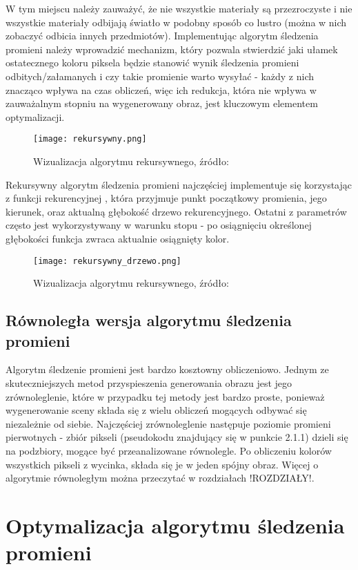 W tym miejscu należy zauważyć, że nie wszystkie materiały są przezroczyste i nie wszystkie materiały odbijają światło w podobny sposób co lustro (można w nich zobaczyć odbicia innych przedmiotów). Implementując algorytm śledzenia promieni należy wprowadzić mechanizm, który pozwala stwierdzić jaki ułamek ostatecznego koloru piksela będzie stanowić wynik śledzenia promieni odbitych/załamanych i czy takie promienie warto wysyłać - każdy z nich znacząco wpływa na czas obliczeń, więc ich redukcja, która nie wpływa w zauważalnym stopniu na wygenerowany obraz, jest kluczowym elementem optymalizacji.


\begin{figure}[h!]
\centering
  \caption{Wizualizacja algorytmu rekursywnego, źródło: \cite{scratch}}
  \texttt{[image: rekursywny.png]}
\end{figure}

Rekursywny algorytm śledzenia promieni najczęściej implementuje się korzystając z funkcji rekurencyjnej \cite{suffern2007}, która przyjmuje punkt początkowy promienia, jego kierunek, oraz aktualną głębokość drzewo rekurencyjnego. Ostatni z parametrów często jest wykorzystywany w warunku stopu - po osiągnięciu określonej głębokości funkcja zwraca aktualnie osiągnięty kolor.


\begin{figure}[h!]
\centering
  \caption{Wizualizacja algorytmu rekursywnego, źródło: \cite{scratch}}
  \texttt{[image: rekursywny\_drzewo.png]}
\end{figure}


\subsection{Równoległa wersja algorytmu śledzenia promieni}

Algorytm śledzenie promieni jest bardzo kosztowny obliczeniowo. Jednym ze skuteczniejszych metod przyspieszenia generowania obrazu jest jego zrównoleglenie, które w przypadku tej metody jest bardzo proste, ponieważ wygenerowanie sceny składa się z wielu obliczeń mogących odbywać się niezależnie od siebie. Najczęściej zrównoleglenie następuje poziomie promieni pierwotnych - zbiór pikseli (pseudokodu znajdujący się w punkcie 2.1.1) dzieli się na podzbiory, mogące być przeanalizowane równolegle. Po obliczeniu kolorów wszystkich pikseli z wycinka, składa się je w jeden spójny obraz. Więcej o algorytmie równoległym można przeczytać w rozdziałach !ROZDZIAŁY!.

\section{Optymalizacja algorytmu śledzenia promieni}
